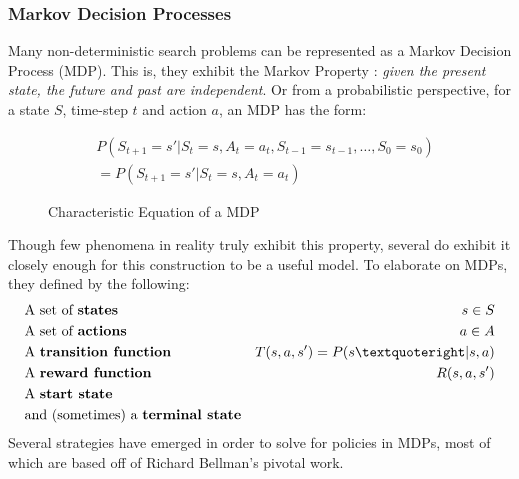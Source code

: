 \documentclass[letterpaper]{article}
\begin{document}
\subsubsection{Markov Decision Processes}\cite{norving_russel_2013}
Many non-deterministic search problems can be represented as a Markov Decision Process (MDP). This is, they exhibit the Markov Property : 
\emph{given the present state, the future and past are independent}. Or from a probabilistic perspective, for a state $S$, time-step $t$ and action $a$, 
an MDP has the form:
\begin{figure}[H]
\centering
\begin{align*}
	&P(S_{t+1} = s'| S_t = s, A_t = a_t, S_{t-1} = s_{t-1}, \dots, S_0 = s_0) \\
	&= P(S_{t+1} = s'| S_t = s, A_t = a_t)
\end{align*}
\caption{Characteristic Equation of a MDP}
\end{figure}
Though few phenomena in reality truly exhibit this property, several do exhibit it 
closely enough for this construction to be a useful model. To elaborate on MDPs, they defined by the following: %
\begin{align*}
	&\text{A set of \bf{states}} &s \in S \\
	&\text{A set of \bf{actions}}  &a \in A \\
	&\text{A \bf{transition function}} &T(s,a,s') =P(s’| s, a)\\
	&\text{A \bf{reward function}} &R(s,a,s')\\
	&\text{A \bf{start state}} &\\
	&\text{and (sometimes) a \bf{terminal state}} &
\end{align*}
Several strategies have emerged in order to solve for policies in MDPs, most of which are based off of Richard Bellman's pivotal work.
\end{document}
